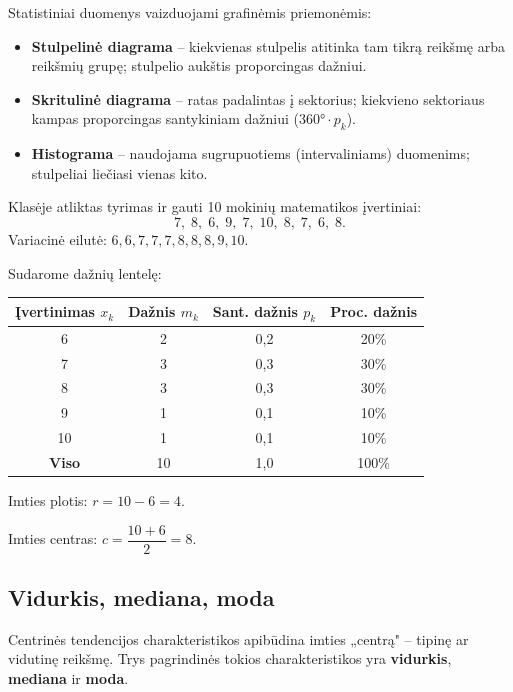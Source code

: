 Statistiniai duomenys vaizduojami grafinėmis priemonėmis:
\begin{itemize}
  \item \textbf{Stulpelinė diagrama} – kiekvienas stulpelis atitinka tam tikrą
        reikšmę arba reikšmių grupę; stulpelio aukštis proporcingas dažniui.
  \item \textbf{Skritulinė diagrama} – ratas padalintas į sektorius; kiekvieno
        sektoriaus kampas proporcingas santykiniam dažniui ($360° \cdot p_k$).
  \item \textbf{Histograma} – naudojama sugrupuotiems (intervaliniams) duomenims;
        stulpeliai liečiasi vienas kito.
\end{itemize}

\begin{example}
Klasėje atliktas tyrimas ir gauti 10 mokinių matematikos įvertiniai:
\[
  7,\; 8,\; 6,\; 9,\; 7,\; 10,\; 8,\; 7,\; 6,\; 8.
\]
Variacinė eilutė: $6, 6, 7, 7, 7, 8, 8, 8, 9, 10$.

Sudarome dažnių lentelę:

\begin{center}
\begin{tabular}{|c|c|c|c|}
\hline
\textbf{Įvertinimas} $x_k$ & \textbf{Dažnis} $m_k$ & \textbf{Sant. dažnis} $p_k$ & \textbf{Proc. dažnis} \\
\hline
6  & 2 & 0,2 & 20\% \\
7  & 3 & 0,3 & 30\% \\
8  & 3 & 0,3 & 30\% \\
9  & 1 & 0,1 & 10\% \\
10 & 1 & 0,1 & 10\% \\
\hline
\textbf{Viso} & 10 & 1,0 & 100\% \\
\hline
\end{tabular}
\end{center}

Imties plotis: $r = 10 - 6 = 4$.

Imties centras: $c = \dfrac{10 + 6}{2} = 8$.
\end{example}

\subsection{Vidurkis, mediana, moda}

Centrinės tendencijos charakteristikos apibūdina imties „centrą" – tipinę ar
vidutinę reikšmę. Trys pagrindinės tokios charakteristikos yra \textbf{vidurkis},
\textbf{mediana} ir \textbf{moda}.

